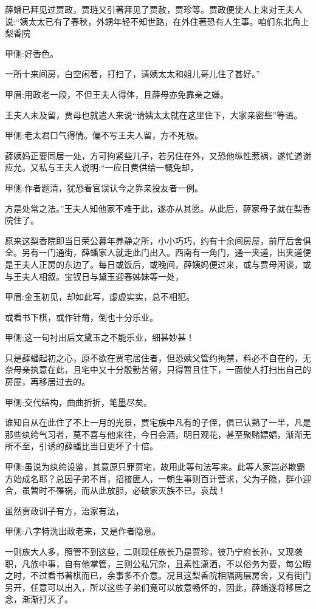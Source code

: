 \begin{parag}
    薛蟠已拜见过贾政，贾琏又引著拜见了贾赦，贾珍等。贾政便使人上来对王夫人说:“姨太太已有了春秋，外甥年轻不知世路，在外住著恐有人生事。咱们东北角上梨香院\begin{note}甲侧:好香色。\end{note}一所十来间房，白空闲著，打扫了，请姨太太和姐儿哥儿住了甚好。”\begin{note}甲眉:用政老一段，不但王夫人得体，且薛母亦免靠亲之嫌。\end{note}王夫人未及留，贾母也就遣人来说“请姨太太就在这里住下，大家亲密些”等语。\begin{note}甲侧:老太君口气得情。偏不写王夫人留，方不死板。\end{note}薛姨妈正要同居一处，方可拘紧些儿子，若另住在外，又恐他纵性惹祸，遂忙道谢应允。又私与王夫人说明:“一应日费供给一概免却，\begin{note}甲侧:作者题清，犹恐看官误认今之靠亲投友者一例。\end{note}方是处常之法。”王夫人知他家不难于此，遂亦从其愿。从此后，薛家母子就在梨香院住了。
\end{parag}


\begin{parag}
    原来这梨香院即当日荣公暮年养静之所，小小巧巧，约有十余间房屋，前厅后舍俱全。另有一门通街，薛蟠家人就走此门出入。西南有一角门，通一夹道，出夹道便是王夫人正房的东边了。每日或饭后，或晚间，薛姨妈便过来，或与贾母闲谈，或与王夫人相叙。宝钗日与黛玉迎春姊妹等一处，\begin{note}甲眉:金玉初见，却如此写，虚虚实实，总不相犯。\end{note}或看书下棋，或作针黹，倒也十分乐业。\begin{note}甲侧:这一句衬出后文黛玉之不能乐业，细甚妙甚！\end{note}只是薛蟠起初之心，原不欲在贾宅居住者，但恐姨父管约拘禁，料必不自在的，无奈母亲执意在此，且宅中又十分殷勤苦留，只得暂且住下，一面使人打扫出自己的房屋，再移居过去的。\begin{note}甲侧:交代结构，曲曲折折，笔墨尽矣。\end{note}谁知自从在此住了不上一月的光景，贾宅族中凡有的子侄，俱已认熟了一半，凡是那些纨绔气习者，莫不喜与他来往，今日会酒，明日观花，甚至聚赌嫖娼，渐渐无所不至，引诱的薛蟠比当日更坏了十倍。\begin{note}甲侧:虽说为纨绔设鉴，其意原只罪贾宅，故用此等句法写来。此等人家岂必欺霸方始成名耶？总因子弟不肖，招接匪人，一朝生事则百计营求，父为子隐，群小迎合，虽暂时不罹祸，而从此放胆，必破家灭族不已，哀哉！\end{note}虽然贾政训子有方，治家有法，\begin{note}甲侧:八字特洗出政老来，又是作者隐意。\end{note}一则族大人多，照管不到这些，二则现任族长乃是贾珍，彼乃宁府长孙，又现袭职，凡族中事，自有他掌管，三则公私冗杂，且素性潇洒，不以俗务为要，每公暇之时，不过看书著棋而已，余事多不介意。况且这梨香院相隔两层房舍，又有街门另开，任意可以出入，所以这些子弟们竟可以放意畅怀的，因此，薛蟠遂将移居之念，渐渐打灭了。
\end{parag}


